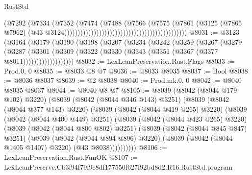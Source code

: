 \begin{lexlean}{RustStd}
\begin{coremodule}
                                                                            (@7292
                                                                              (@7334
                                                                                (@7352
                                                                                  (@7474
                                                                                    (@7488
                                                                                      (@7566
                                                                                        (@7575
                                                                                          (@7861
                                                                                            (@3125
                                                                                              (@7865
                                                                                                @7962)
                                                                                              (@43
                                                                                                @3124))))))))))))))))))))))))))))))))))))))))))))))
@8031 := @3123
    (@3164
      (@3179
        (@3190
          (@3198
            (@3207
              (@3234
                (@3242
                  (@3259
                    (@3267
                      (@3279
                        (@3287
                          (@3301
                            (@3309
                              (@3322 (@3330 (@3343 (@3351 (@3367 (@3377 @8011)))))))))))))))))))
@8032 := LexLeanPreservation.Rust.Flags
@8033 := Prod.{0, 0}
@8035 := @8033 @8 @7
@8036 := @8033 @8035
@8037 := Bool
@8038 := @8036 @8037
@8039 := @2 @8038
@8040 := Prod.mk.{0, 0}
@8042 := @8040 @8035 @8037
@8044 := @8040 @8 @7
@8105 := @8039
    (@8042 (@8044 @179 @102) @3220)
    (@8039
      (@8042 (@8044 @346 @143) @3251)
      (@8039
        (@8042 (@8044 @377 @143) @3220)
        (@8039
          (@8042 (@8044 @419 @265) @3220)
          (@8039
            (@8042 (@8044 @400 @449) @3251)
            (@8039
              (@8042 (@8044 @423 @265) @3220)
              (@8039
                (@8042 (@8044 @800 @802) @3251)
                (@8039
                  (@8042 (@8044 @845 @847) @3251)
                  (@8039
                    (@8042 (@8044 @894 @896) @3220)
                    (@8039 (@8042 (@8044 @1405 @1407) @3220) (@43 @8038))))))))))
@8106 := LexLeanPreservation.Rust.FunOK
@8107 := LexLeanPreserve.Cb3f94f79f9e8df177550f627f92bd8d2.R16.RustStd.program

\end{coremodule}
\end{lexlean}
